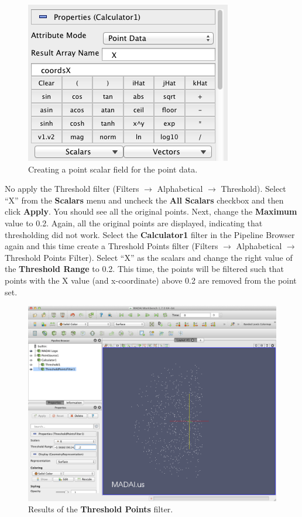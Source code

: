 \documentclass[12pt]{article}
\begin{document}
\begin{figure}[htbp]
   \centering
   \includegraphics[scale=.5]{images/ThresholdPointsFilterCalculator.png} %
   \caption{Creating a point scalar field for the point data.}
   \label{fig:ThresholdPointsFilterCalculator}
\end{figure}

No apply the Threshold filter (Filters $\rightarrow$ Alphabetical $\rightarrow$ Threshold). Select ``X'' from the \textbf{Scalars} menu and uncheck the \textbf{All Scalars} checkbox and then click \textbf{Apply}. You should see all the original points. Next, change the \textbf{Maximum} value to 0.2. Again, all the original points are displayed, indicating that thresholding did not work. Select the \textbf{Calculator1} filter in the Pipeline Browser again and this time create a Threshold Points filter (Filters $\rightarrow$ Alphabetical $\rightarrow$ Threshold Points Filter). Select ``X'' as the scalars and change the right value of the \textbf{Threshold Range} to 0.2. This time, the points will be filtered such that points with the X value (and x-coordinate) above 0.2 are removed from the point set.

\begin{figure}[htbp]
   \centering
   \includegraphics[scale=.25]{images/ThresholdPointsFilter.png} %
   \caption{Results of the \textbf{Threshold Points} filter.}
   \label{fig:ThresholdPointsFilter}
\end{figure}
\end{document}
